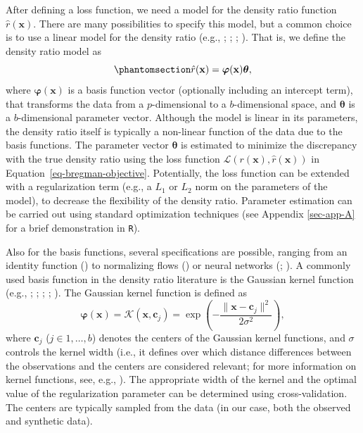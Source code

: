 \documentclass[
]{article}
\newcommand{\bx}{\mathbf{x}}
\begin{document}
After defining a loss function, we need a model for the density ratio
function \(\hat{r}(\bx)\). There are many possibilities to specify this
model, but a common choice is to use a linear model for the density
ratio (e.g., ;
;
;
). That is, we
define the density ratio model as
\begin{equation}\phantomsection\label{eq-dr-model}{
\hat{r}(\bx) = \boldsymbol{\varphi}(\bx) \boldsymbol{\theta},
}\end{equation} where \(\boldsymbol{\varphi}(\bx)\) is a basis function
vector (optionally including an intercept term), that transforms the
data from a \(p\)-dimensional to a \(b\)-dimensional space, and
\(\boldsymbol{\theta}\) is a \(b\)-dimensional parameter vector.
Although the model is linear in its parameters, the density ratio itself
is typically a non-linear function of the data due to the basis
functions. The parameter vector \(\boldsymbol{\theta}\) is estimated to
minimize the discrepancy with the true density ratio using the loss
function \(\mathcal{L}(r(\bx), \hat{r}(\bx))\) in
Equation~\ref{eq-bregman-objective}. Potentially, the loss function can
be extended with a regularization term (e.g., a \(L_1\) or \(L_2\) norm
on the parameters of the model), to decrease the flexibility of the
density ratio. Parameter estimation can be carried out using standard
optimization techniques (see Appendix \ref{sec-app-A} for a brief
demonstration in \texttt{R}).

Also for the basis functions, several specifications are possible,
ranging from an identity function
() to normalizing flows
() or
neural networks (;
). A commonly
used basis function in the density ratio literature is the Gaussian
kernel function (e.g., ;
;
;
;
). The Gaussian
kernel function is defined as \[
\boldsymbol{\varphi}(\bx) = \mathcal{K}(\bx, \boldsymbol{c}_j) = 
\exp\left(
- \frac{\lVert\bx - \boldsymbol{c}_j \rVert^2}{2 \sigma^2}
\right),
\] where \(\boldsymbol{c}_j\) (\(j \in 1, \dots, b\)) denotes the
centers of the Gaussian kernel functions, and \(\sigma\) controls the
kernel width (i.e., it defines over which distance differences between
the observations and the centers are considered relevant; for more
information on kernel functions, see, e.g.,
). The appropriate width
of the kernel and the optimal value of the regularization parameter can
be determined using cross-validation. The centers are typically sampled
from the data (in our case, both the observed and synthetic data).
\end{document}
